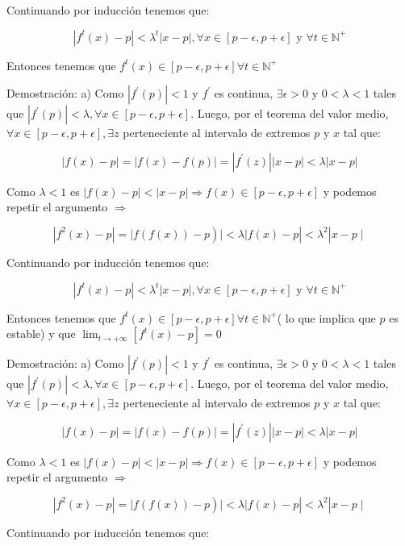 \documentclass[11pt]{beamer}
\begin{document}
Continuando por inducción tenemos que:

$$
\left|f^{t}(x)-p\right|<\lambda^{t}|x-p|, \forall x \in[p-\epsilon, p+\epsilon] \text { y } \forall t \in \mathbb{N}^{+}
$$

Entonces tenemos que $f^{t}(x) \in[p-\epsilon, p+\epsilon] \forall t \in \mathbb{N}^{+}$

Demostración: a) Como $\left|f^{\prime}(p)\right|<1$ y $f^{\prime}$ es continua, $\exists \epsilon>0$ y $0<\lambda<1$ tales que $\left|f^{\prime}(p)\right|<\lambda, \forall x \in[p-\epsilon, p+\epsilon]$. Luego, por el teorema del valor medio, $\forall x \in[p-\epsilon, p+\epsilon], \exists z$ perteneciente al intervalo de extremos $p$ y $x$ tal que:

$$
|f(x)-p|=|f(x)-f(p)|=\left|f^{\prime}(z)\right||x-p|<\lambda|x-p|
$$

Como $\lambda<1$ es $|f(x)-p|<|x-p| \Longrightarrow f(x) \in[p-\epsilon, p+\epsilon]$ y podemos repetir el argumento $\Longrightarrow$

$$
\left.\left|f^{2}(x)-p\right|=\mid f(f(x))-p\right)|<\lambda| f(x)-p\left|<\lambda^{2}\right| x-p \mid
$$

Continuando por inducción tenemos que:

$$
\left|f^{t}(x)-p\right|<\lambda^{t}|x-p|, \forall x \in[p-\epsilon, p+\epsilon] \text { y } \forall t \in \mathbb{N}^{+}
$$

Entonces tenemos que $f^{t}(x) \in[p-\epsilon, p+\epsilon] \forall t \in \mathbb{N}^{+}$( lo que implica que $p$ es estable) y que $\lim _{t \rightarrow+\infty}\left[f^{t}(x)-p\right]=0$

Demostración: a) Como $\left|f^{\prime}(p)\right|<1$ y $f^{\prime}$ es continua, $\exists \epsilon>0$ y $0<\lambda<1$ tales que $\left|f^{\prime}(p)\right|<\lambda, \forall x \in[p-\epsilon, p+\epsilon]$. Luego, por el teorema del valor medio, $\forall x \in[p-\epsilon, p+\epsilon], \exists z$ perteneciente al intervalo de extremos $p$ y $x$ tal que:

$$
|f(x)-p|=|f(x)-f(p)|=\left|f^{\prime}(z)\right||x-p|<\lambda|x-p|
$$

Como $\lambda<1$ es $|f(x)-p|<|x-p| \Longrightarrow f(x) \in[p-\epsilon, p+\epsilon]$ y podemos repetir el argumento $\Longrightarrow$

$$
\left.\left|f^{2}(x)-p\right|=\mid f(f(x))-p\right)|<\lambda| f(x)-p\left|<\lambda^{2}\right| x-p \mid
$$

Continuando por inducción tenemos que:
\end{document}
